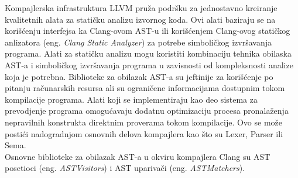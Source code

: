 \documentclass[12pt,oneside]{memoir}
\begin{document}
Kompajlerska infrastruktura LLVM pru\v{z}a podr\v{s}ku za jednostavno kreiranje kvalitetnih alata za stati\v{c}ku analizu izvornog koda. Ovi alati
baziraju se na kori\v{s}\'{c}enju interfejsa ka Clang-ovom AST-u ili kori\v{s}\'{c}enjem Clang-ovog stati\v{c}kog anlizatora (eng. \textit{Clang Static Analyzer}) za potrebe simboli\v{c}kog izvr\v{s}avanja programa. Alati za stati\v{c}ku analizu mogu koristiti kombinaciju tehnika obilaska AST-a i simboli\v{c}kog izvr\v{s}avanja programa u zavisnosti od kompleksnosti analize koja je potrebna. Biblioteke za obilazak AST-a su jeftinije za kori\v{s}\'{c}enje  po pitanju ra\v{c}unarskih resursa ali su ograni\v{c}ene informacijama dostupnim tokom kompilacije programa. Alati koji se implementiraju kao deo sistema za prevodjenje programa omogu\'{c}avaju dodatnu optimizaciju procesa pronala\v{z}enja nepravilnih konstrukta direktnim proverama tokom kompilacije. Ovo se mo\v{z}e posti\'{c}i nadogradnjom osnovnih delova kompajlera kao \v{s}to su Lexer, Parser ili Sema. \\Osnovne biblioteke za obilazak AST-a u okviru kompajlera Clang su AST posetioci (eng. \textit{ASTVisitors}) i  AST upariva\v{c}i (eng. \textit{ASTMatchers}).

\end{document}
